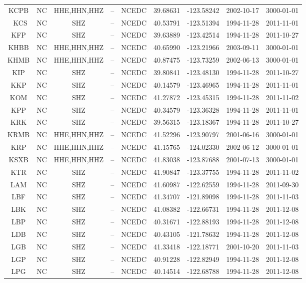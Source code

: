 \documentclass{article}
\begin{document}
\begin{table}
\begin{tabular}{c c c c c c c c c}
KCPB & NC & HHE,HHN,HHZ & -- & NCEDC & 39.68631 & -123.58242 & 2002-10-17 & 3000-01-01 \\\
KCS & NC & SHZ & -- & NCEDC & 40.53791 & -123.51394 & 1994-11-28 & 2011-11-01 \\
KFP & NC & SHZ & -- & NCEDC & 39.63889 & -123.42514 & 1994-11-28 & 2011-10-27 \\
KHBB & NC & HHE,HHN,HHZ & -- & NCEDC & 40.65990 & -123.21966 & 2003-09-11 & 3000-01-01 \\
KHMB & NC & HHE,HHN,HHZ & -- & NCEDC & 40.87475 & -123.73259 & 2002-06-13 & 3000-01-01 \\
KIP & NC & SHZ & -- & NCEDC & 39.80841 & -123.48130 & 1994-11-28 & 2011-10-27 \\
KKP & NC & SHZ & -- & NCEDC & 40.14579 & -123.46965 & 1994-11-28 & 2011-11-01 \\
KOM & NC & SHZ & -- & NCEDC & 41.27872 & -123.45315 & 1994-11-28 & 2011-11-02 \\
KPP & NC & SHZ & -- & NCEDC & 40.34579 & -123.36328 & 1994-11-28 & 2011-11-01 \\
KRK & NC & SHZ & -- & NCEDC & 39.56315 & -123.18367 & 1994-11-28 & 2011-10-27 \\
KRMB & NC & HHE,HHN,HHZ & -- & NCEDC & 41.52296 & -123.90797 & 2001-06-16 & 3000-01-01 \\
KRP & NC & HHE,HHN,HHZ & -- & NCEDC & 41.15765 & -124.02330 & 2002-06-12 & 3000-01-01 \\
KSXB & NC & HHE,HHN,HHZ & -- & NCEDC & 41.83038 & -123.87688 & 2001-07-13 & 3000-01-01 \\
KTR & NC & SHZ & -- & NCEDC & 41.90847 & -123.37755 & 1994-11-28 & 2011-11-02 \\
LAM & NC & SHZ & -- & NCEDC & 41.60987 & -122.62559 & 1994-11-28 & 2011-09-30 \\
LBF & NC & SHZ & -- & NCEDC & 41.34707 & -121.89098 & 1994-11-28 & 2011-11-03 \\
LBK & NC & SHZ & -- & NCEDC & 41.08382 & -122.66731 & 1994-11-28 & 2011-12-08 \\
LBP & NC & SHZ & -- & NCEDC & 40.31671 & -122.88193 & 1994-11-28 & 2011-12-08 \\
LDB & NC & SHZ & -- & NCEDC & 40.43105 & -121.78632 & 1994-11-28 & 2011-12-08 \\
LGB & NC & SHZ & -- & NCEDC & 41.33418 & -122.18771 & 2001-10-20 & 2011-11-03 \\
LGP & NC & SHZ & -- & NCEDC & 40.91228 & -122.82949 & 1994-11-28 & 2011-12-08 \\
LPG & NC & SHZ & -- & NCEDC & 40.14514 & -122.68788 & 1994-11-28 & 2011-12-08 \\

\end{tabular}
\end{table}
\end{document}
